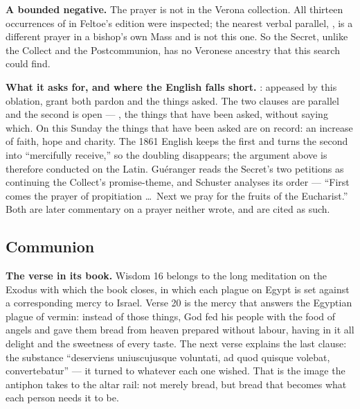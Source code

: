 \textbf{A bounded negative.} The prayer is not in the Verona collection. All
thirteen occurrences of  in Feltoe's edition were inspected;
the nearest verbal parallel, , is a different prayer in a bishop's own Mass and is not this one.
So the Secret, unlike the Collect and the Postcommunion, has no Veronese
ancestry that this search could find.

\textbf{What it asks for, and where the English falls short.} :
appeased by this oblation, grant both pardon and the things asked. The two
 clauses are parallel and the second is open --- ,
the things that have been asked, without saying which. On this Sunday the
things that have been asked are on record: an increase of faith, hope and
charity. The 1861 English keeps the first  and turns the
second into ``mercifully receive,'' so the doubling disappears; the argument
above is therefore conducted on the Latin. Guéranger reads the Secret's two
petitions as continuing the Collect's promise-theme, and Schuster analyses its
order --- ``First comes the prayer of propitiation \dots\ Next we pray for the
fruits of the Eucharist.'' Both are later commentary on a prayer neither wrote,
and are cited as such.

\elementguard
\subsection*{Communion }


\textbf{The verse in its book.} Wisdom 16 belongs to the long meditation on the
Exodus with which the book closes, in which each plague on Egypt is set against
a corresponding mercy to Israel. Verse 20 is the mercy that answers the
Egyptian plague of vermin: instead of those things, God fed his people with the
food of angels and gave them bread from heaven prepared without labour, having
in it all delight and the sweetness of every taste. The next verse explains the
last clause: the substance ``deserviens uniuscujusque voluntati, ad quod quisque
volebat, convertebatur'' --- it turned to whatever each one wished. That is the
image the antiphon takes to the altar rail: not merely bread, but bread that
becomes what each person needs it to be.

